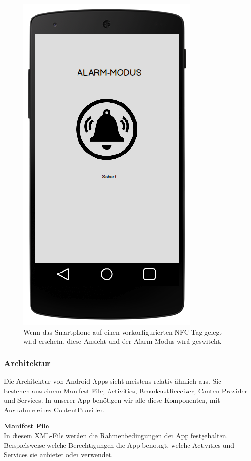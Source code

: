 \begin{figure}[H]
	\centering
		\includegraphics[scale=0.3]{report/img/mockup_nfc.png}
	\caption{Wenn das Smartphone auf einen vorkonfigurierten NFC Tag gelegt wird erscheint diese Ansicht und der Alarm-Modus wird geswitcht.}
	\label{fig:mockupCamera}
\end{figure}

\subsubsection{Architektur}
\label{sec:androidArchSolution}
Die Architektur von Android Apps sieht meistens relativ ähnlich aus. Sie bestehen aus einem Manifest-File, Activities, BroadcastReceiver, ContentProvider und Services. In unserer App benötigen wir alle diese Komponenten, mit Ausnahme eines ContentProvider.

\textbf{Manifest-File}\\
In diesem XML-File werden die Rahmenbedingungen der App festgehalten. Beispielsweise welche Berechtigungen die App benötigt, welche Activities und Services sie anbietet oder verwendet.


